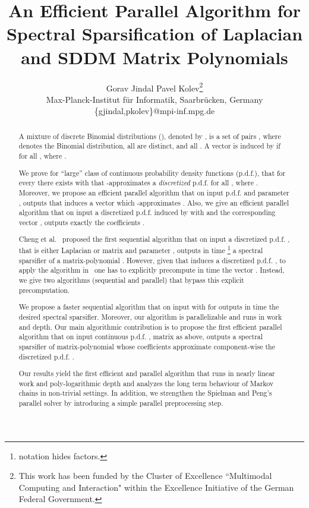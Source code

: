 \documentclass[11pt]{article}
\title{An Efficient Parallel Algorithm for Spectral Sparsification of Laplacian and SDDM Matrix Polynomials}
\author{
Gorav Jindal \qquad Pavel Kolev\footnote{This work has been funded by the Cluster of Excellence ``Multimodal Computing and Interaction" within the Excellence Initiative of the German Federal Government.}\\
Max-Planck-Institut f\"{u}r Informatik, Saarbr\"{u}cken, Germany\\
\{gjindal,pkolev\}@mpi-inf.mpg.de
}
\date{}
\numberwithin{thm}{section}
\begin{document}
\maketitle

\begin{abstract}
A mixture of discrete Binomial distributions (), denoted by , is a set of pairs , where  denotes the Binomial distribution, all  are distinct,  and all . A vector  is induced by  if  for all , where .

We prove for ``large'' class  of continuous probability density functions (p.d.f.), that for every  there exists  with  that -approximates a \emph{discretized} p.d.f.  for all , where . Moreover, we propose an efficient parallel algorithm that on input p.d.f.  and parameter , outputs  that induces a vector  which -approximates . Also, we give an efficient parallel algorithm that on input a discretized p.d.f.  induced by  with  and the corresponding vector , outputs exactly the coefficients .

Cheng et al.~\cite{CCLPT15} proposed the first sequential algorithm that on input a discretized p.d.f. ,  that is either Laplacian or  matrix and parameter , outputs in time \footnote{ notation hides  factors.} a spectral sparsifier of a matrix-polynomial . However, given   that induces a discretized p.d.f. , to apply the algorithm in~\cite{CCLPT15} one has to explicitly precompute in  time the vector . Instead, we give two algorithms (sequential and parallel) that bypass this explicit precomputation.

We propose a faster sequential algorithm that on input   with  for  outputs in  time the desired spectral sparsifier. Moreover, our algorithm is parallelizable and runs in  work and  depth. Our main algorithmic contribution is to propose the first efficient parallel algorithm that on input continuous p.d.f. , matrix  as above, outputs a spectral sparsifier of matrix-polynomial whose coefficients approximate component-wise the discretized p.d.f. .

Our results yield the first efficient and parallel algorithm that runs in nearly linear work and poly-logarithmic depth and analyzes the long term behaviour of Markov chains in non-trivial settings. In addition, we strengthen the Spielman and Peng's~\cite{PS14} parallel  solver by introducing a simple parallel preprocessing step.
\end{abstract}


\thispagestyle{empty}

\setcounter{page}{0}
\end{document}
